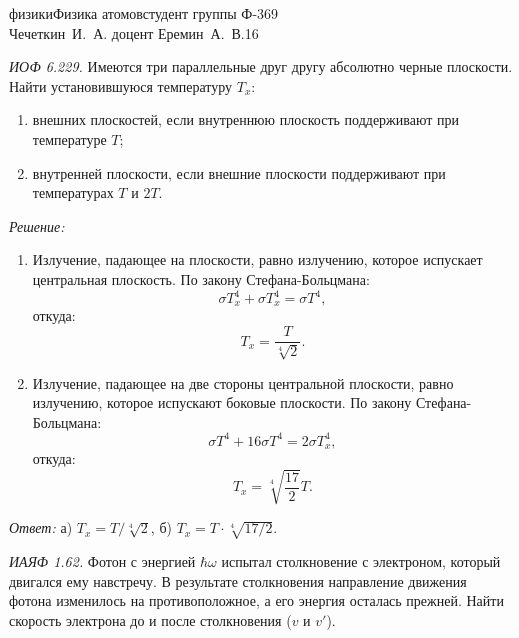 




\renewcommand{\labelenumi}{\asbuk{enumi})}
\newcommand{\mr}[1]{\mathrm{#1}}


{физики}{Физика атомов}{студент группы Ф-369\\Чечеткин~И.~А.}
{доцент Еремин~А.~В.}{\!\!}{16}
\newpage

\emph{ИОФ 6.229.}
Имеются три параллельные друг другу абсолютно черные плоскости.
Найти установившуюся температуру \( T_x \):
\vspace*{-.8em}
\begin{enumerate} \itemsep-.5em
    \item внешних плоскостей, если внутреннюю плоскость поддерживают при
    температуре \( T \);
    \item внутренней плоскости, если внешние плоскости поддерживают при
    температурах \( T \) и \( 2T \).
\end{enumerate}

\vspace*{2em}
\emph{Решение:}
\begin{enumerate}
    \item Излучение, падающее на плоскости, равно излучению, которое испускает
    центральная плоскость. По закону Стефана-Больцмана:
    \[
        \sigma T_x^4 + \sigma T_x^4 = \sigma T^4,
    \]
    откуда:
    \[
        T_x = \frac{T}{\sqrt[4]{2}}.
    \]
    \item Излучение, падающее на две стороны центральной плоскости, равно
    излучению, которое испускают боковые плоскости. По закону Стефана-Больцмана:
    \[
        \sigma T^4 + 16\sigma T^4 = 2\sigma T_x^4,
    \]
    откуда:
    \[
        T_x = \sqrt[4]{\frac{17}{2}}T.
    \]
\end{enumerate}
\vspace*{2em}        
\emph{Ответ:} а) \( T_x = T/\sqrt[4]{2} \), б) \( T_x = T\cdot\sqrt[4]{17/2} \). 
\newpage

\emph{ИАЯФ 1.62.}
Фотон с энергией \( \hbar\omega \) испытал столкновение с электроном, который
двигался ему навстречу. В результате столкновения направление движения фотона
изменилось на противоположное, а его энергия осталась прежней. Найти скорость
электрона до и после столкновения (\( v \) и \( v' \)).

